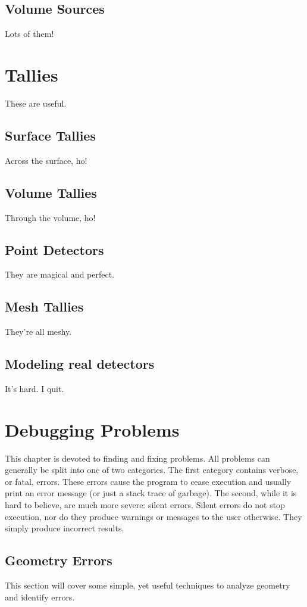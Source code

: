 \documentclass[10pt,a4paper]{book}
\begin{document}
\section{Volume Sources}
Lots of them!

\chapter{Tallies}
These are useful.

\section{Surface Tallies}
Across the surface, ho!

\section{Volume Tallies}
Through the volume, ho!

\section{Point Detectors}
They are magical and perfect.

\section{Mesh Tallies}
They're all meshy.

\section{Modeling real detectors}
It's hard. I quit.

\chapter{Debugging Problems}
This chapter is devoted to finding and fixing problems. All problems can generally be split into one of two categories. The first category contains verbose, or fatal, errors. These errors cause the program to cease execution and usually print an error message (or just a stack trace of garbage). The second, while it is hard to believe, are much more severe: silent errors. Silent errors do not stop execution, nor do they produce warnings or messages to the user otherwise. They simply produce incorrect results.

\section{Geometry Errors}
This section will cover some simple, yet useful techniques to analyze geometry and identify errors.
\end{document}
